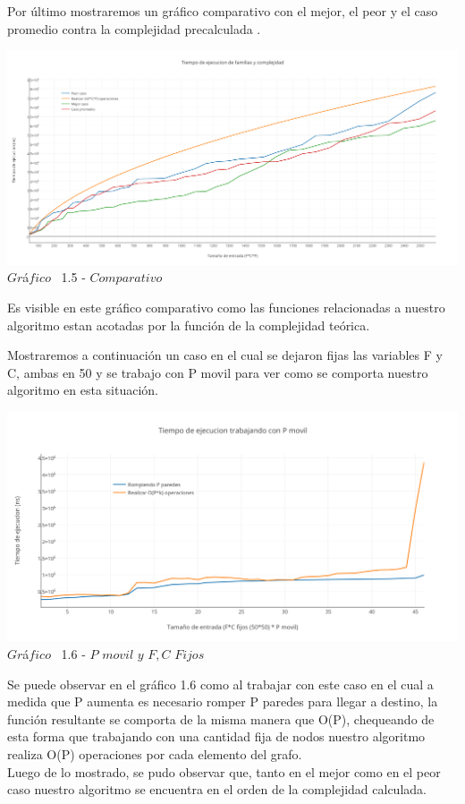 Por \'ultimo mostraremos un gr\'afico comparativo con el mejor, el peor y el caso promedio contra la complejidad precalculada .\\

  
  \vspace*{0.3cm} \vspace*{0.3cm}
  \begin{center}
\includegraphics[scale=0.4]{./EJ1/comparativo1.png}
{$Gr$\'a$fico$ \ 1.5 - $Comparativo$}
  \end{center}
  \vspace*{0.3cm}
  
 Es visible en este gr\'afico comparativo como las funciones relacionadas a nuestro algoritmo estan acotadas por la funci\'on de la complejidad te\'orica.

Mostraremos a continuaci\'on un caso en el cual se dejaron fijas las variables F y C, ambas en 50 y se trabajo con P movil para ver como se comporta nuestro algoritmo en esta situaci\'on.

\vspace*{0.3cm} \vspace*{0.3cm}
  \begin{center}
\includegraphics[scale=0.65]{./EJ1/pMovil.png}
{$Gr$\'a$fico$ \ 1.6 - $P$ $movil$ $y$ $F,C$ $Fijos$}
  \end{center}
  \vspace*{0.3cm}

Se puede observar en el gr\'afico 1.6 como al trabajar con este caso en el cual a medida que P aumenta es necesario romper P paredes para llegar a destino, la funci\'on resultante se comporta de la misma manera que O(P), chequeando de esta forma que trabajando con una cantidad fija de nodos nuestro algoritmo realiza O(P) operaciones por cada elemento del grafo.\\

Luego de lo mostrado, se pudo observar que, tanto en el mejor como en el peor caso nuestro algoritmo se encuentra en el orden de la complejidad calculada.